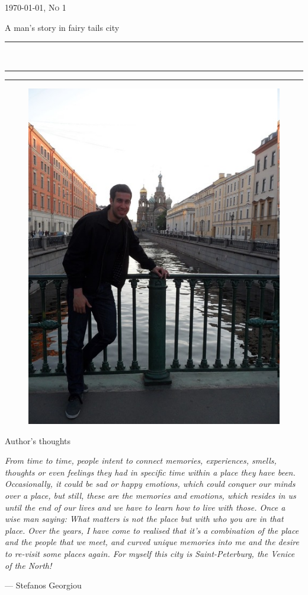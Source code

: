 \documentclass[10pt,a4paper]{article} %
\newcommand{\HorRule}[1]{\noindent\rule{\linewidth}{#1}} %
\newcommand{\SepRule}{\noindent	%
\begin{center}
\rule{250pt}{1pt} %
\end{center}
}
\newcommand{\NewsletterName}[1]{ %
\begin{center}
\Huge \usefont{T1}{fvs}{b}{n} %
#1
\end{center}	
\par \normalsize \normalfont}
\newcommand{\JournalIssue}[1]{ %
\hfill \textsc{\mydate \today, No #1} %
\par \normalsize \normalfont}
\newcommand{\NewsItem}[1]{ %
\usefont{T1}{fvs}{n}{n} %
\vspace{24pt}\large #1\vspace{3pt} %
\par \normalsize \normalfont}
\begin{document}
\JournalIssue{1} %

\NewsletterName{A man's story in fairy tails city} %

\noindent\HorRule{3pt} \\[-0.75\baselineskip] %
\HorRule{1pt} %


\vspace{0.5cm}
\SepRule
\vspace{-0.5cm}

\begin{center}
\begin{minipage}[h]{0.75 \linewidth}
\begin{figure}
\includegraphics[width=0.38 \textwidth]{media/front_picture.jpg} \\
\end{figure}
	
\NewsItem{Author's thoughts} %
\vspace{3pt} %
\textit{
From time to time, people intent to connect memories, experiences, smells, 
thoughts or even feelings they had in specific time within a place they have been. 
Occasionally, it could be sad or happy emotions, which could conquer our minds over a place, 
but still, these are the memories and emotions, 
which resides in us until the end of our lives and we have to learn how to 
live with those. 
Once a wise man saying: 
\textit{What matters is not the place but with who you are in that place}. 
Over the years, I have come to realised that it's a combination of the place and 
the people that we meet, and curved unique memories into me and the desire to 
re-visit some places again. 
For myself this city is Saint-Peterburg, the Venice of the North!
}
\par\hfill --- Stefanos Georgiou
\end{minipage}
\end{center}
\end{document}
